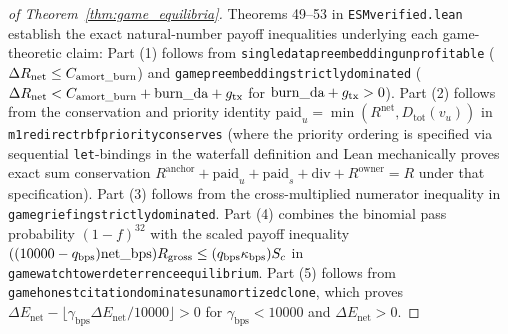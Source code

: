 \documentclass[runningheads,a4paper]{llncs}
\renewcommand{\_}{\textunderscore\allowbreak}
\begin{document}
\begin{proof}[of Theorem~\ref{thm:game_equilibria}]
Theorems 49--53 in \texttt{ESM\_verified.lean} establish the exact natural-number payoff inequalities underlying each game-theoretic claim: Part (1) follows from \texttt{single\_data\_pre\_embedding\_unprofitable} ($\Delta R_{\text{net}} \le C_{\text{amort\_burn}}$) and \texttt{game\_pre\_embedding\_strictly\_dominated} ($\Delta R_{\text{net}} < C_{\text{amort\_burn}} + \text{burn\_da} + g_{\text{tx}}$ for $\text{burn\_da} + g_{\text{tx}} > 0$). Part (2) follows from the conservation and priority identity $\text{paid}_u = \min(R^{\text{net}},\allowbreak D_{\text{tot}}(v_u))$ in \texttt{m1\_redirect\_rbf\_priority\_conserves} (where the priority ordering is specified via sequential \texttt{let}-bindings in the waterfall definition and Lean mechanically proves exact sum conservation $R^{\text{anchor}} + \text{paid}_u + \text{paid}_s + \text{div} + R^{\text{owner}} = R$ under that specification). Part (3) follows from the cross-multiplied numerator inequality in \texttt{game\_griefing\_strictly\_dominated}. Part (4) combines the binomial pass probability $(1-f)^{32}$ with the scaled payoff inequality $((10000 - q_{\text{bps}})\text{net\_bps}) R_{\text{gross}} \le (q_{\text{bps}} \kappa_{\text{bps}}) S_c$ in \texttt{game\_watchtower\_deterrence\_equilibrium}. Part (5) follows from \texttt{game\_honest\_citation\_dominates\_unamortized\_clone}, which proves $\Delta E_{\text{net}} - \lfloor \gamma_{\text{bps}} \Delta E_{\text{net}} / 10000 \rfloor > 0$ for $\gamma_{\text{bps}} < 10000$ and $\Delta E_{\text{net}} > 0$.
\end{proof}
\end{document}
